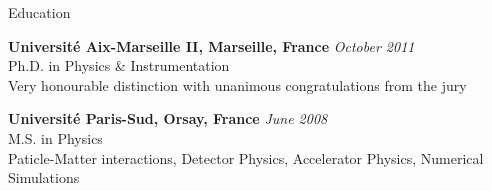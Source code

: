 \documentclass{resume} %
\begin{document}
\begin{rSection}{Education}

{\bf Universit\'e Aix-Marseille II, Marseille, France} \hfill {\em October 2011} \\ 
Ph.D. in Physics \& Instrumentation \\
Very honourable distinction with unanimous congratulations from the jury

{\bf Universit\'e Paris-Sud, Orsay, France} \hfill {\em June 2008} \\
M.S. in Physics \\
Paticle-Matter interactions, Detector Physics, Accelerator Physics, Numerical Simulations

\end{rSection}

\end{document}
